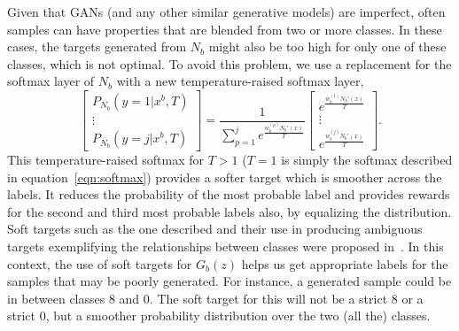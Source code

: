 \documentclass[10pt,twocolumn,letterpaper]{article}
\begin{document}
	Given that GANs (and any other similar generative models) are imperfect, often samples can have properties that are blended from two or more classes. 
	In these cases, the targets generated from $N_b$ might also be too high for  only one of these classes, which is not optimal. 
	To avoid this problem, we use a replacement for the softmax layer of $N_b$ with a new temperature-raised softmax layer,
	\begin{equation}
	\label{eqn:temp_softmax}
	\begin{bmatrix}
	P_{N_b} (y = 1 \vert x^b, T ) \\
	\vdots \\
	P_{N_b} (y = j \vert x^b, T  ) 
	\end{bmatrix}
	=
	\frac{1}{\sum_{p=1}^j e^{\frac{w_b^{(p)}N_b'(x)}{T}}}
	\begin{bmatrix}
	e^{\frac{w_b^{(1)}N_b'(x)}{T}} \\
	\vdots \\
	e^{\frac{w_b^{(j)}N_b'(x)}{T}} 
	\end{bmatrix}.
	\end{equation} 
	This temperature-raised softmax for $T>1$ ($T=1$ is simply the softmax described in equation~\ref{eqn:softmax}) provides a softer target which is smoother across the labels. 
	It reduces the probability of the most probable label and provides rewards for the second and third most probable labels also, by equalizing the distribution. 
	Soft targets such as the one described and their use in producing ambiguous targets exemplifying the relationships between classes were proposed in~\cite{hinton2015distilling}. 
	In this context, the use of soft targets for $G_b(z)$ helps us get appropriate labels for the samples that may be poorly generated. 
	For instance, a generated sample could be in between classes $8$ and $0$. 
	The soft target for this will not be a strict $8$ or a strict $0$, but a smoother probability distribution over the two (all the) classes. 
	
\end{document}
